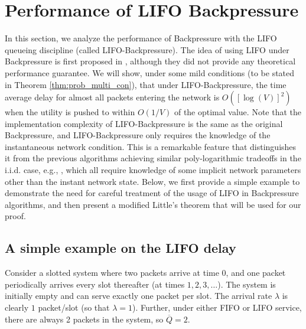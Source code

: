 \documentclass[journal]{IEEEtran}
\begin{document}
\section{Performance of LIFO Backpressure}\label{section:LIFO-Backpressure-analysis}
In this section, we analyze the performance of Backpressure with the LIFO queueing discipline (called LIFO-Backpressure). The idea of using LIFO under Backpressure is first proposed in \cite{scott_lifo_ipsn}, although they did not provide any theoretical performance guarantee. We will show, under some mild conditions (to be stated in Theorem \ref{thm:prob_multi_con}), that under LIFO-Backpressure, the time average delay for almost all packets entering the network is $O([\log(V)]^2)$ when the utility is pushed to within $O(1/V)$ of the optimal value. Note that the implementation complexity of LIFO-Backpressure is the same as the original Backpressure, and LIFO-Backpressure only requires the knowledge of the instantaneous network condition. This is a remarkable feature that distinguishes it from the previous algorithms  achieving similar poly-logarithmic tradeoffs in the i.i.d. case, e.g., \cite{neelysuperfast} \cite{neelyenergydelay} \cite{huangneely_dr_tac}, which all require knowledge of some implicit network parameters other than the instant network state. 
Below,  we first provide a simple example to demonstrate the need for careful treatment of the usage of LIFO in Backpressure algorithms, and then present a modified Little's theorem that will be used for our proof. 


\vspace{-.1in}
\subsection{A simple example on the LIFO delay}
Consider a slotted system where two packets arrive at time $0$, and one packet periodically arrives every slot thereafter
(at times $1, 2, 3,\ldots$). The system is initially empty and can serve exactly one packet per slot.  The arrival rate $\lambda$
is clearly $1$ 
packet/slot (so that $\lambda = 1$).  Further, under either FIFO or LIFO service, there are always 2 packets in the system, 
so $\overline{Q} = 2$. 
\end{document}
